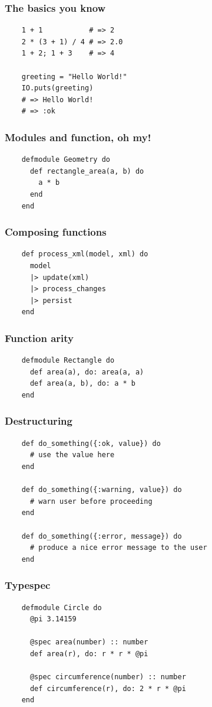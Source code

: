 \documentclass{beamer}
\begin{document}
\begin{frame}[fragile]
  \frametitle{The basics you know}
  \begin{lstlisting}
    1 + 1           # => 2
    2 * (3 + 1) / 4 # => 2.0
    1 + 2; 1 + 3    # => 4

    greeting = "Hello World!"
    IO.puts(greeting)
    # => Hello World!
    # => :ok
  \end{lstlisting}
\end{frame}

\begin{frame}[fragile]
  \frametitle{Modules and function, oh my!}
  \begin{lstlisting}
    defmodule Geometry do
      def rectangle_area(a, b) do
        a * b
      end
    end
  \end{lstlisting}
\end{frame}

\begin{frame}[fragile]
  \frametitle{Composing functions}
  \begin{lstlisting}
    def process_xml(model, xml) do
      model
      |> update(xml)
      |> process_changes
      |> persist
    end
  \end{lstlisting}
\end{frame}

\begin{frame}[fragile]
  \frametitle{Function arity}
  \begin{lstlisting}
    defmodule Rectangle do
      def area(a), do: area(a, a)
      def area(a, b), do: a * b
    end
  \end{lstlisting}
\end{frame}

\begin{frame}[fragile]
  \frametitle{Destructuring}
  \begin{lstlisting}
    def do_something({:ok, value}) do
      # use the value here
    end

    def do_something({:warning, value}) do
      # warn user before proceeding
    end

    def do_something({:error, message}) do
      # produce a nice error message to the user
    end
  \end{lstlisting}
\end{frame}

\begin{frame}[fragile]
  \frametitle{Typespec}
  \begin{lstlisting}
    defmodule Circle do
      @pi 3.14159

      @spec area(number) :: number
      def area(r), do: r * r * @pi
        
      @spec circumference(number) :: number
      def circumference(r), do: 2 * r * @pi
    end
  \end{lstlisting}
\end{frame}
\end{document}
